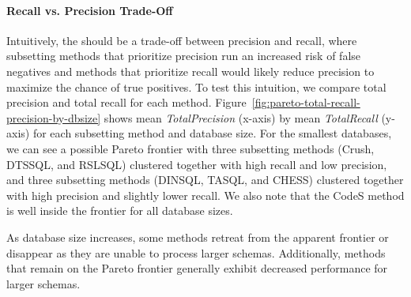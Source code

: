 \paragraph{\textbf{Recall vs. Precision Trade-Off}}

Intuitively, the should be a trade-off between precision and recall, where subsetting methods that prioritize precision run an increased risk of false negatives and methods that prioritize recall would likely reduce precision to maximize the chance of true positives.
To test this intuition, we compare total precision and total recall for each method.
Figure~\ref{fig:pareto-total-recall-precision-by-dbsize} shows mean \emph{TotalPrecision} (x-axis) by mean \emph{TotalRecall} (y-axis) for each subsetting method and database size.
For the smallest databases, we can see a possible Pareto frontier with three subsetting methods (Crush, DTSSQL, and RSLSQL) clustered together with high recall and low precision, and three subsetting methods (DINSQL, TASQL, and CHESS) clustered together with high precision and slightly lower recall.
We also note that the CodeS method is well inside the frontier for all database sizes.

As database size increases, some methods retreat from the apparent frontier or disappear as they are unable to process larger schemas.
Additionally, methods that remain on the Pareto frontier generally exhibit decreased performance for larger schemas.



